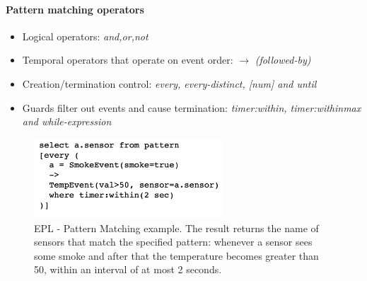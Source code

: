 \documentclass[10pt,a4paper]{article}
\begin{document}
\paragraph{Pattern matching operators}
\begin{itemize}
	\item Logical operators: \textit{and,or,not}
	\item Temporal operators that operate on event order: $\rightarrow$ \textit{(followed-by)}
	\item Creation/termination control: \textit{every, every-distinct, [num] and until} 
	\item Guards filter out events and cause termination: \textit{timer:within, timer:withinmax and while-expression}
\end{itemize}

\begin{figure}[ht!]
 \hfill \includegraphics[width=200pt]{images/pattern-matching-example.png}\hspace*{\fill}
 \caption{EPL - Pattern Matching example. The result returns the name of sensors that match the specified pattern: whenever a sensor sees some smoke and after that the temperature becomes greater than 50, within an interval of at most 2 seconds.}
\end{figure} 
\end{document}
